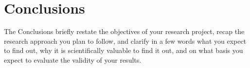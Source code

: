 \chapter{Conclusions}
\label{ch:conclusions}

The Conclusions briefly restate the objectives of your research project, recap the 
research approach you plan to follow, and clarify in a few words what you expect to 
find out, why it is scientifically valuable to find it out, and on what basis you expect to 
evaluate the validity of your results. 